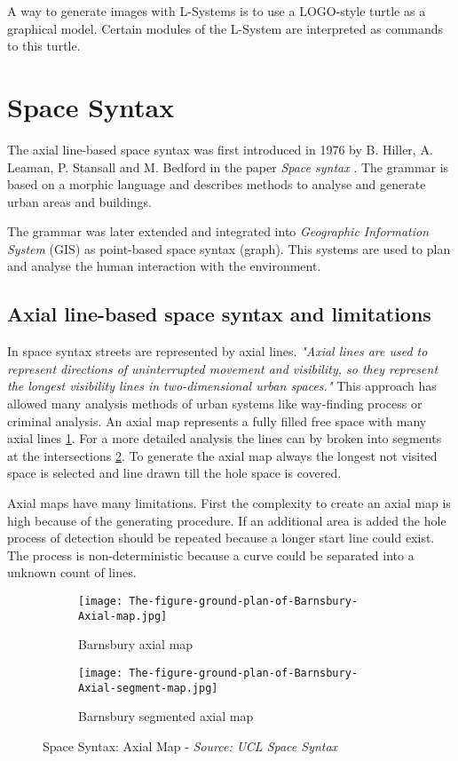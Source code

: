 A way to generate images with L-Systems is to use a LOGO-style turtle as a graphical model. Certain modules of the L-System are interpreted as commands to this turtle.

\pagebreak
\section{Space Syntax} \label{sec:space_syntax}
The axial line-based space syntax was first introduced in 1976 by B. Hiller, A. Leaman, P. Stansall and M. Bedford in the paper \textit{Space syntax} \citep{spaceSyntax:1976}. The grammar is based on a morphic language and describes methods to analyse and generate urban areas and buildings.

The grammar was later extended and integrated into \textit{Geographic Information System} (GIS) as point-based space syntax (graph). This systems are used to plan and analyse the human interaction with the environment.

\subsection{Axial line-based space syntax and limitations}
In space syntax streets are represented by axial lines. 
\textit{"Axial lines are used to represent directions of uninterrupted movement and visibility, so they represent the longest visibility lines in two-dimensional urban spaces."} \citep{integrationSpaceSyntaxGIS:2002}
This approach has allowed many analysis methods of urban systems like way-finding process or criminal analysis. An axial map represents a fully filled free space with many axial lines \ref{fig:barnsbury_axial_map}. For a more detailed analysis the lines can by broken into segments at the intersections \ref{fig:barnsbury_segmented_axial_map}. To generate the axial map always the longest not visited space is selected and line drawn till the hole space is covered.

Axial maps have many limitations. First the complexity to create an axial map is high because of the generating procedure. If an additional area is added the hole process of detection should be repeated because a longer start line could exist. The process is non-deterministic because a curve could be separated into a unknown count of lines.

\begin{figure}[h]
    \centering
    \begin{subfigure}[b]{0.4\textwidth}
        \texttt{[image: The-figure-ground-plan-of-Barnsbury-Axial-map.jpg]}
        \caption{Barnsbury axial map}
        \label{fig:barnsbury_axial_map}
    \end{subfigure}
    \quad
    \begin{subfigure}[b]{0.4\textwidth}
        \texttt{[image: The-figure-ground-plan-of-Barnsbury-Axial-segment-map.jpg]}
        \caption{Barnsbury segmented axial map}
        \label{fig:barnsbury_segmented_axial_map}
    \end{subfigure}
    \caption{Space Syntax: Axial Map - \textit{Source: UCL Space Syntax \citep{SpaceSyntaxExampels}}}
    \label{fig:SpaceSyntaxAxialMap}
\end{figure}

